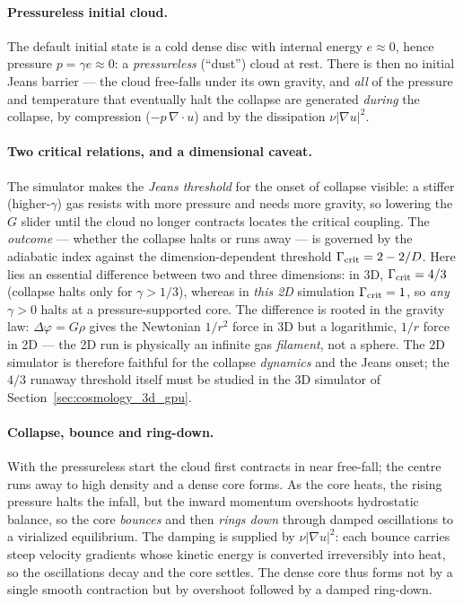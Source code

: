 \paragraph{Pressureless initial cloud.}
The default initial state is a cold dense disc with internal energy
$e \approx 0$, hence pressure $p = \gamma e \approx 0$: a \emph{pressureless}
(``dust'') cloud at rest. There is then no initial Jeans barrier --- the cloud
free-falls under its own gravity, and \emph{all} of the pressure and temperature
that eventually halt the collapse are generated \emph{during} the collapse, by
compression ($-p\,\nabla\!\cdot u$) and by the dissipation $\nu|\nabla u|^2$.

\paragraph{Two critical relations, and a dimensional caveat.}
The simulator makes the \emph{Jeans threshold} for the onset of collapse visible:
a stiffer (higher-$\gamma$) gas resists with more pressure and needs more gravity,
so lowering the $G$ slider until the cloud no longer contracts locates the
critical coupling. The \emph{outcome} --- whether the collapse halts or runs away
--- is governed by the adiabatic index against the dimension-dependent threshold
$\Gamma_{\rm crit} = 2 - 2/D$. Here lies an essential difference between two and
three dimensions: in 3D, $\Gamma_{\rm crit} = 4/3$ (collapse halts only for
$\gamma > 1/3$), whereas in \emph{this 2D} simulation $\Gamma_{\rm crit} = 1$, so
\emph{any} $\gamma > 0$ halts at a pressure-supported core. The difference is
rooted in the gravity law: $\Delta\varphi = G\rho$ gives the Newtonian
$1/r^2$ force in 3D but a logarithmic, $1/r$ force in 2D --- the 2D run is
physically an infinite gas \emph{filament}, not a sphere. The 2D simulator is
therefore faithful for the collapse \emph{dynamics} and the Jeans onset; the
$4/3$ runaway threshold itself must be studied in the 3D simulator of
Section~\ref{sec:cosmology_3d_gpu}.

\paragraph{Collapse, bounce and ring-down.}
With the pressureless start the cloud first contracts in near free-fall; the
centre runs away to high density and a dense core forms. As the core heats, the
rising pressure halts the infall, but the inward momentum overshoots hydrostatic
balance, so the core \emph{bounces} and then \emph{rings down} through damped
oscillations to a virialized equilibrium. The damping is supplied by
$\nu|\nabla u|^2$: each bounce carries steep velocity gradients whose kinetic
energy is converted irreversibly into heat, so the oscillations decay and the
core settles. The dense core thus forms not by a single smooth contraction but
by overshoot followed by a damped ring-down.

